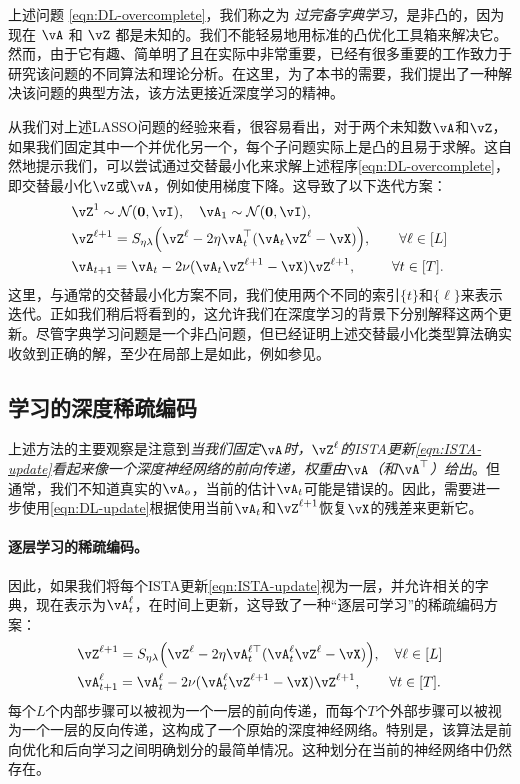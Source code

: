 \documentclass[../../book-main_zh.tex]{subfiles}
\begin{document}
上述问题 \eqref{eqn:DL-overcomplete}，我们称之为 \textit{过完备字典学习}，是非凸的，因为现在 $\vA$ 和 $\vZ$ 都是未知的。我们不能轻易地用标准的凸优化工具箱来解决它。然而，由于它有趣、简单明了且在实际中非常重要，已经有很多重要的工作致力于研究该问题的不同算法和理论分析。在这里，为了本书的需要，我们提出了一种解决该问题的典型方法，该方法更接近深度学习的精神。

从我们对上述LASSO问题的经验来看，很容易看出，对于两个未知数$\vA$和$\vZ$，如果我们固定其中一个并优化另一个，每个子问题实际上是凸的且易于求解。这自然地提示我们，可以尝试通过交替最小化来求解上述程序\eqref{eqn:DL-overcomplete}，即交替最小化$\vZ$或$\vA$，例如使用梯度下降。这导致了以下迭代方案：
\begin{align}
    & \vZ^{1}
     \sim \dNorm(\vzero, \vI), \quad \vA_{1}
     \sim \dNorm(\vzero, \vI), \\ 
    &\vZ^{\ell + 1} = S_{\eta\lambda}\rp{\vZ^{\ell} - 2\eta\vA_{t}^{\top}(\vA_{t}\vZ^{\ell} - \vX)}, \qquad \forall \ell \in [L] \label{eqn:ISTA-update}\\ 
    &\vA_{t + 1} = \vA_{t} - 2\nu (\vA_{t}\vZ^{\ell + 1} - \vX)\vZ^{\ell + 1}, \qquad\;\; \forall t \in [T].\label{eqn:DL-update}
\end{align}
这里，与通常的交替最小化方案不同，我们使用两个不同的索引$\{t\}$和$\{\ell\}$来表示迭代。正如我们稍后将看到的，这允许我们在深度学习的背景下分别解释这两个更新。尽管字典学习问题是一个非凸问题，但已经证明上述交替最小化类型算法确实收敛到正确的解，至少在局部上是如此，例如参见\cite{alekh-2016}。


\subsection{学习的深度稀疏编码}
\label{sec:LISTA}
上述方法的主要观察是注意到\textit{当我们固定$\vA$时，$\vZ^\ell$的ISTA更新\eqref{eqn:ISTA-update}看起来像一个深度神经网络的前向传递，权重由$\vA$（和$\vA^{\top}$）给出}。但通常，我们不知道真实的$\vA_o$，当前的估计$\vA_t$可能是错误的。因此，需要进一步使用\eqref{eqn:DL-update}根据使用当前$\vA_t$和$\vZ^{\ell +1}$恢复$\vX$的残差来更新它。

\paragraph{逐层学习的稀疏编码。}
因此，如果我们将每个ISTA更新\eqref{eqn:ISTA-update}视为一层，并允许相关的字典，现在表示为$\vA_t^\ell$，在时间上更新，这导致了一种“逐层可学习”的稀疏编码方案：
\begin{align}
    & \vZ^{\ell + 1} = S_{\eta\lambda}\rp{\vZ^{\ell} - 2\eta\vA_{t}^{\ell\top}(\vA_{t}^\ell\vZ^{\ell} - \vX)}, \quad \forall \ell \in [L] \\ 
    & \vA_{t + 1}^\ell = \vA_{t}^\ell - 2\nu (\vA_{t}^\ell\vZ^{\ell + 1} - \vX)\vZ^{\ell + 1}, \qquad \forall t \in [T].
\end{align}
每个$L$个内部步骤可以被视为一个一层的前向传递，而每个$T$个外部步骤可以被视为一个一层的反向传递，这构成了一个原始的深度神经网络。特别是，该算法是前向优化和后向学习之间明确划分的最简单情况。这种划分在当前的神经网络中仍然存在。
\end{document}
